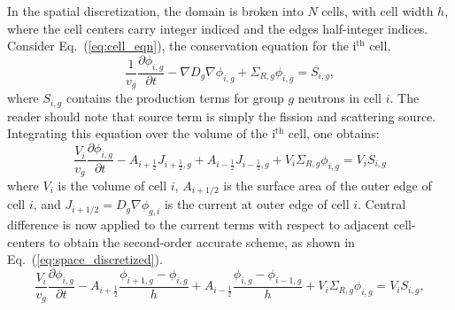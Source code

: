 \documentclass{style/nseJournal}
\newcommand{\dxdt}[1]{\frac{\partial #1}{\partial t}}
\newcommand{\be}{\begin{equation}}
\newcommand{\ee}{\end{equation}}
\newcommand{\LEQ}[1]{\label{eq:#1}}
\newcommand{\EQ}[1]{Eq.~(\ref{eq:#1})}
\newcommand{\half}{\frac{1}{2}}
\begin{document}
In the spatial discretization, the domain is broken into $N$ cells, with cell width $h$, where the cell centers carry integer indiced and the edges half-integer indices.  
Consider \EQ{cell_eqn}, the conservation equation for the i$^{\text{th}}$ cell,
\be
	\frac{1}{v_g} \dxdt{\phi_{i,g}} - \nabla D_{g} \nabla \phi_{i,g} + 	
	\Sigma_{R,g} \phi_{i,g}  =  S_{i,g},
	\LEQ{cell_eqn} 
\ee
where $S_{i,g}$ contains the production terms for group $g$ neutrons in cell $i$.  
The reader should note that source term is simply the fission and scattering source.  
Integrating this equation over the volume of the i$^{\text{th}}$ cell, one obtains:
\be
	\frac{V_i}{v_g} \dxdt{\phi_{i,g}} - A_{i+\half} J_{i+\half,g} + A_{i-\half} 
	J_{i-\half,g} + V_i \Sigma_{R,g} \phi_{i,g} = V_i S_{i,g}
\ee
where $V_i $ is the volume of cell $i$, $ A_{i+1/2} $ is the surface area of the outer edge of cell $i$, and $ J_{i+1/2} = D_g \nabla \phi_{g,i} $ is the current at outer edge of cell $i$.  
Central difference is now applied to the current terms with respect to adjacent cell-centers to obtain the second-order accurate scheme, as shown in \EQ{space_discretized}.  
\be
	\frac{V_i}{v_g} \dxdt{\phi_{i,g}} - A_{i+\half} \frac{\phi_{i+1,g} - \phi_{i,g}}{h} + A_{i-\half} \frac{\phi_{i,g} 
		- \phi_{i-1,g}}{h} + V_i \Sigma_{R,g} \phi_{i,g} = V_i S_{i,g},
	\LEQ{space_discretized} 
\ee
\end{document}
